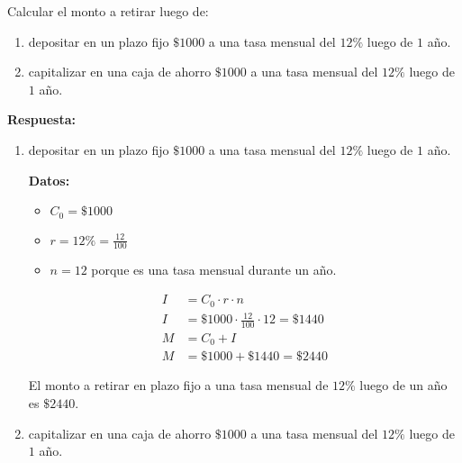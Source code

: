 \documentclass[12pt]{examdesign}
\theoremstyle{plain}
\theoremstyle{definition}
\theoremstyle{remark}
\begin{document}
    \begin{shortanswer}[title={Leemos el material de consulta y realizamos las actividades propuestas.}, rearrange=no]
    	\begin{question}
    		Calcular el monto a retirar luego de:	
    		\begin{enumerate}
    			\item depositar en un plazo fijo $\$1000$ a una tasa mensual del $12\%$ luego de $1$ año.
    			\item capitalizar en una caja de ahorro $\$1000$ a una tasa mensual del $12\%$ luego de $1$ año.
    		\end{enumerate}
    	    \begin{answer}
    	    	\textbf{Respuesta:}
    	    	\begin{enumerate}
    	    		\item depositar en un plazo fijo $\$1000$ a una tasa mensual del $12\%$ luego de $1$ año.
    	    		
    	    		\textbf{Datos:}
    	    		\begin{itemize}
    	    			\item $C_{0}=\$1000$
    	    			\item $r=12\%=\displaystyle{\frac{12}{100}}$
    	    			\item $n=12$ porque es una tasa mensual durante un año.
    	    		\end{itemize}
    	    		
    	    		\begin{align*}
    	    		    I&=C_{0}\cdot r\cdot n\\
    	    		    I&=\$1000\cdot \frac{12}{100}\cdot 12=\$1440\\
    	    		    M&=C_{0}+I\\
    	    		    M&=\$1000+\$1440=\$2440
    	    		\end{align*}
    	    		
    	    		El monto a retirar en plazo fijo a una tasa mensual de $12\%$ luego de un año es $\$2440$.
    	    		\item capitalizar en una caja de ahorro $\$1000$ a una tasa mensual del $12\%$ luego de $1$ año.
    	    		

\end{enumerate}
\end{answer}
\end{question}
\end{shortanswer}
\end{document}
